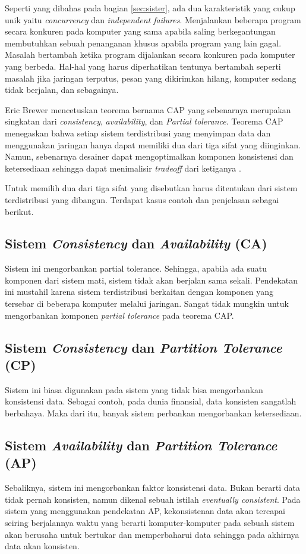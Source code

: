 Seperti yang dibahas pada bagian \ref{sec:sister}, ada dua karakteristik yang cukup unik yaitu \emph{concurrency} dan \emph{independent failures}.
Menjalankan beberapa program secara konkuren pada komputer yang sama apabila saling berkegantungan membutuhkan sebuah penanganan khusus apabila program yang lain gagal.
Masalah bertambah ketika program dijalankan secara konkuren pada komputer yang berbeda. Hal-hal yang harus diperhatikan tentunya bertambah seperti masalah jika jaringan terputus, pesan yang dikirimkan hilang, komputer sedang tidak berjalan, dan sebagainya.

Eric Brewer mencetuskan teorema bernama CAP yang sebenarnya merupakan singkatan dari \emph{consistency}, \emph{availability}, dan \emph{Partial tolerance}. Teorema CAP menegaskan bahwa setiap sistem terdistribusi yang menyimpan data dan menggunakan jaringan hanya dapat memiliki dua dari tiga sifat yang diinginkan. Namun, sebenarnya desainer dapat mengoptimalkan komponen konsistensi dan ketersediaan sehingga dapat menimalisir \emph{tradeoff} dari ketiganya \parencite{captheorem}.

Untuk memilih dua dari tiga sifat yang disebutkan harus ditentukan dari sistem terdistribusi yang dibangun. Terdapat kasus contoh dan penjelasan sebagai berikut.

\subsection{Sistem \emph{Consistency} dan \emph{Availability} (CA)}
Sistem ini mengorbankan partial tolerance. Sehingga, apabila ada suatu komponen dari sistem mati, sistem tidak akan berjalan sama sekali. Pendekatan ini mustahil karena sistem terdistribusi berkaitan dengan komponen yang tersebar di beberapa komputer melalui jaringan. Sangat tidak mungkin untuk mengorbankan komponen \emph{partial tolerance} pada teorema CAP.

\subsection{Sistem \emph{Consistency} dan \emph{Partition Tolerance} (CP)}
Sistem ini biasa digunakan pada sistem yang tidak bisa mengorbankan konsistensi data. Sebagai contoh, pada dunia finansial, data konsisten sangatlah berbahaya. Maka dari itu, banyak sistem perbankan mengorbankan ketersediaan.

\subsection{Sistem \emph{Availability} dan \emph{Partition Tolerance} (AP)}
Sebaliknya, sistem ini mengorbankan faktor konsistensi data. Bukan berarti data tidak pernah konsisten, namun dikenal sebuah istilah \emph{eventually consistent}. Pada sistem yang menggunakan pendekatan AP, kekonsistenan data akan tercapai seiring berjalannya waktu yang berarti komputer-komputer pada sebuah sistem akan berusaha untuk bertukar dan memperbaharui data sehingga pada akhirnya data akan konsisten.

